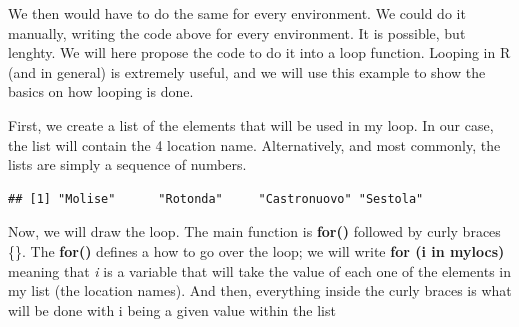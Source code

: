 \documentclass[
]{book}
\newenvironment{Shaded}{\begin{snugshade}}{\end{snugshade}}
\newcommand{\CommentTok}[1]{\textcolor[rgb]{0.56,0.35,0.01}{\textit{#1}}}
\newcommand{\FunctionTok}[1]{\textcolor[rgb]{0.00,0.00,0.00}{#1}}
\newcommand{\NormalTok}[1]{#1}
\newcommand{\OtherTok}[1]{\textcolor[rgb]{0.56,0.35,0.01}{#1}}
\newcommand{\SpecialCharTok}[1]{\textcolor[rgb]{0.00,0.00,0.00}{#1}}
\begin{document}
We then would have to do the same for every environment. We could do it manually, writing the code above for every environment. It is possible, but lenghty. We will here propose the code to do it into a loop function. Looping in R (and in general) is extremely useful, and we will use this example to show the basics on how looping is done.

First, we create a list of the elements that will be used in my loop. In our case, the list will contain the 4 location name. Alternatively, and most commonly, the lists are simply a sequence of numbers.

\begin{Shaded}
\end{Shaded}

\begin{verbatim}
## [1] "Molise"      "Rotonda"     "Castronuovo" "Sestola"
\end{verbatim}

Now, we will draw the loop. The main function is \textbf{for()} followed by curly braces \{\}. The \textbf{for()} defines a how to go over the loop; we will write \textbf{for (i in mylocs)} meaning that \emph{i} is a variable that will take the value of each one of the elements in my list (the location names). And then, everything inside the curly braces is what will be done with i being a given value within the list
\end{document}
